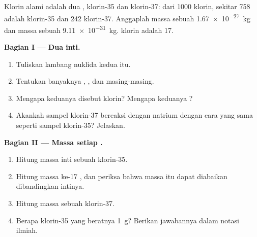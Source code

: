 \begin{problem}
\label{pb:g9:inside-the-atom:1}
Klorin alami adalah  dua , klorin-35 dan klorin-37: dari
1000  klorin, sekitar 758 adalah klorin-35 dan 242 klorin-37.
Anggaplah massa sebuah  \qty{1.67e-27}{kg} dan massa sebuah
 \qty{9.11e-31}{kg}.  klorin adalah 17.

\medskip
\noindent\textbf{Bagian I --- Dua inti.}
\begin{enumerate}
  \item Tuliskan lambang nuklida kedua  itu.
  \item Tentukan banyaknya , , dan  masing-masing.
  \item Mengapa keduanya disebut klorin? Mengapa keduanya ?
  \item Akankah sampel klorin-37 bereaksi dengan natrium dengan cara yang
        sama seperti sampel klorin-35? Jelaskan.
\end{enumerate}

\medskip
\noindent\textbf{Bagian II --- Massa setiap .}
\begin{enumerate}[resume]
  \item Hitung massa inti sebuah  klorin-35.
  \item Hitung massa ke-17 , dan periksa bahwa massa itu dapat
        diabaikan dibandingkan intinya.
  \item Hitung massa sebuah  klorin-37.
  \item Berapa  klorin-35 yang beratnya \qty{1}{g}? Berikan jawabannya
        dalam notasi ilmiah.
\end{enumerate}


\end{problem}

